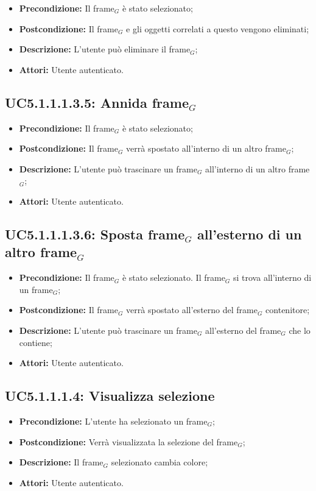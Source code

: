\begin{itemize}
	\item \textbf{Precondizione:} Il frame$_G$ è stato selezionato;
	\item \textbf{Postcondizione:} Il frame$_G$ e gli oggetti correlati a questo vengono eliminati;
	\item \textbf{Descrizione:} L'utente può eliminare il frame$_G$;
	\item \textbf{Attori:} Utente autenticato.
\end{itemize}
\subsection{ UC5.1.1.1.3.5: Annida frame$_G$}

\begin{itemize}
	\item \textbf{Precondizione:} Il frame$_G$ è stato selezionato;
	\item \textbf{Postcondizione:} Il frame$_G$ verrà spostato all'interno di un altro frame$_G$;
	\item \textbf{Descrizione:} L'utente può trascinare un frame$_G$ all'interno di un altro frame$_G$;
	\item \textbf{Attori:} Utente autenticato.
\end{itemize}
\subsection{ UC5.1.1.1.3.6: Sposta frame$_G$ all'esterno di un altro frame$_G$}

\begin{itemize}
	\item \textbf{Precondizione:} Il frame$_G$ è stato selezionato. Il frame$_G$ si trova all'interno di un frame$_G$;
	\item \textbf{Postcondizione:} Il frame$_G$ verrà spostato all'esterno del frame$_G$ contenitore;
	\item \textbf{Descrizione:} L'utente può trascinare un frame$_G$ all'esterno del frame$_G$ che lo contiene;
	\item \textbf{Attori:} Utente autenticato.
\end{itemize}
\subsection{ UC5.1.1.1.4: Visualizza selezione}

\begin{itemize}
	\item \textbf{Precondizione:} L'utente ha selezionato un frame$_G$;
	\item \textbf{Postcondizione:} Verrà visualizzata la selezione del frame$_G$;
	\item \textbf{Descrizione:} Il frame$_G$ selezionato cambia colore;
	\item \textbf{Attori:} Utente autenticato.
\end{itemize}
\newpage
